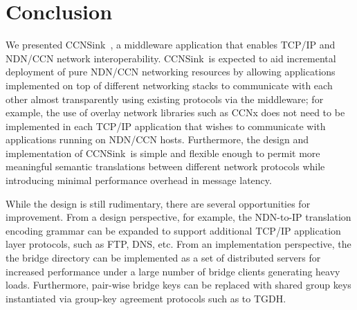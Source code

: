 \documentclass{sigcomm}
\newcommand{\sink}{{\sf CCNSink}}
\begin{document}






\section{Conclusion}
We presented \sink\ , a middleware application that enables TCP/IP and NDN/CCN network interoperability. \sink\ is expected to aid incremental deployment of pure NDN/CCN networking resources by allowing applications implemented on top of different networking stacks to communicate with each other almost transparently using existing protocols via the middleware; for example, the use of overlay network libraries such as CCNx does not need to be implemented in each TCP/IP application that wishes to communicate with applications running on NDN/CCN hosts. Furthermore, the design and implementation of \sink\ is simple and flexible enough to permit more meaningful semantic translations between different network protocols while introducing minimal performance overhead in message latency. 

While the design is still rudimentary, there are several opportunities for improvement. From a design perspective, for example, the NDN-to-IP translation encoding grammar can be expanded to support additional TCP/IP application layer protocols, such as FTP, DNS, etc. From an implementation perspective, the the bridge directory can be implemented as a set of distributed servers for increased performance under a large number of bridge clients generating heavy loads. Furthermore, pair-wise bridge keys can be replaced with shared group keys instantiated via group-key agreement protocols such as to TGDH. 



\end{document}
